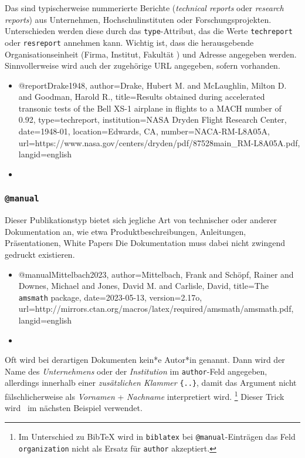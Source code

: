 Das sind typischerweise nummerierte Berichte (\emph{technical reports} oder
\emph{research reports}) aus Unternehmen, Hochschulinstituten oder
Forschungsprojekten. Unterschieden werden diese durch das
\texttt{type}-Attribut, das die Werte \texttt{techreport} oder
\texttt{resreport} annehmen kann. Wichtig ist, dass die herausgebende
Organisationseinheit (Firma, Institut, Fakultät \etc) und Adresse angegeben
werden. Sinnvollerweise wird auch der zugehörige URL angegeben, sofern
vorhanden.
%
\begin{itemize}
\item[]
\begin{GenericCode}[numbers=none]
@report{Drake1948,
  author={Drake, Hubert M. and McLaughlin, Milton D. and Goodman, Harold R.},
  title={Results obtained during accelerated transonic tests of the {Bell} {XS-1} airplane in flights to a {MACH} number of 0.92},
  type={techreport},
  institution={NASA Dryden Flight Research Center},
  date={1948-01},
  location={Edwards, CA},
  number={NACA-RM-L8A05A},
  url={https://www.nasa.gov/centers/dryden/pdf/87528main_RM-L8A05A.pdf},
  langid={english}
}
\end{GenericCode}
\item[\cite{Drake1948}] 
\end{itemize}


\subsubsection{\texttt{\bfseries @manual}}
\label{sec:@manual}

Dieser Publikationstyp bietet sich jegliche Art von technischer oder anderer
Dokumentation an, wie etwa Produktbeschreibungen, Anleitungen,
Präsentationen, White Papers \usw Die Dokumentation muss dabei nicht zwingend
gedruckt existieren.
%
\begin{itemize}
\item[]
\begin{GenericCode}[numbers=none]
@manual{Mittelbach2023,
  author={Mittelbach, Frank and Schöpf, Rainer and Downes, Michael and Jones, David M. and Carlisle, David},
  title={The \texttt{amsmath} package},
  date={2023-05-13},
  version={2.17o},
  url={http://mirrors.ctan.org/macros/latex/required/amsmath/amsmath.pdf},
  langid={english}
}
\end{GenericCode}
\item[\cite{Mittelbach2023}] 
\end{itemize}
%
Oft wird bei derartigen Dokumenten kein*e Autor*in genannt. Dann wird der
Name des \emph{Unternehmens} oder der \emph{Institution} im
\texttt{author}-Feld angegeben, allerdings innerhalb einer
\emph{zusätzlichen Klammer} \texttt{\{..\}}, damit das Argument nicht
fälschlicherweise als \emph{Vornamen} + \emph{Nachname} interpretiert wird.%
\footnote{Im Unterschied zu BibTeX wird in \texttt{biblatex} bei
\texttt{@manual}-Einträgen das Feld \texttt{organization} nicht als Ersatz
für \texttt{author} akzeptiert.} Dieser Trick wird \ua\ im nächsten Beispiel
verwendet.

